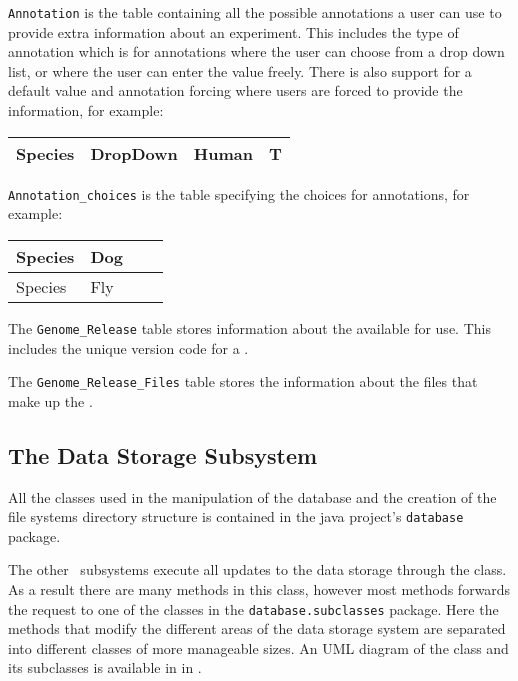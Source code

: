 \texttt{Annotation} is the table containing all the possible annotations a user can use to provide extra information about an experiment. This includes the type of annotation which is  for annotations where the user can choose from a drop down list, or  where the user can enter the value freely. There is also support for a default value and annotation forcing where users are forced to provide the information, for example:
\begin{center}
  \begin{tabular}{| l | l | l | l|}
    \hline
    Species & DropDown & Human & T \\ \hline
  \end{tabular}
\end{center}

\texttt{Annotation\_choices} is the table specifying the choices for  annotations, for example:\\
\begin{center}
  \begin{tabular}{| l | l | l | l|}
    \hline
    Species & Dog \\ \hline
    Species & Fly \\ \hline
  \end{tabular}
\end{center}

The \texttt{Genome\_Release} table stores information about the  available for use. This includes the unique version code for a \cite{UCSCGRVERSION}.

The \texttt{Genome\_Release\_Files} table stores the information about the files that make up the .

\subsection{The Data Storage Subsystem}
All the classes used in the manipulation of the database and the creation of the file systems directory structure is contained in the java project's \texttt{database} package.

The other \appName\ subsystems execute all updates to the data storage through the  class. As a result there are many methods in this class, however most methods forwards the request to one of the classes in the \texttt{database.subclasses} package. Here the methods that modify the different areas of the data storage system are separated into different classes of more manageable sizes. An UML diagram of the  class and its subclasses is available in  in  .

